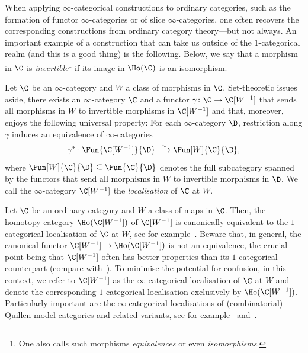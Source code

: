 \documentclass[a4paper]{amsart}
\begin{document}
When applying $\infty$-categorical constructions to ordinary categories, such as
the formation of functor $\infty$-categories or of slice $\infty$-categories,
one often recovers the corresponding constructions from ordinary category
theory---but not always. An important example of a construction that can take us
outside of the $1$-categorical realm (and this is a good thing) is the
following. Below, we say that a morphism in $\C$ is
\emph{invertible}\footnote{One also calls such morphisms \emph{equivalences} or
  even \emph{isomorphisms}.} if its image in $\Ho(\C)$ is an isomorphism.

\begin{defprop}
  \label{defprop:localisation}
  Let $\C$ be an $\infty$-category and $W$ a class of morphisms in $\C$.
  Set-theoretic issues aside, there exists an $\infty$-category $\C$ and a
  functor $\gamma\colon\C\to\C[W^{-1}]$ that sends all morphisms in $W$ to
  invertible morphisms in $\C[W^{-1}]$ and that, moreover, enjoys the following
  universal property: For each $\infty$-category $\D$, restriction along
  $\gamma$ induces an equivalence of $\infty$-categories
  \[
    \gamma^*\colon\Fun{\C[W^{-1}]}{\D}\stackrel{\sim}{\longrightarrow}\Fun[W]{\C}{\D},
  \]
  where $\Fun[W]{\C}{\D}\subseteq\Fun{\C}{\D}$ denotes the full subcategory
  spanned by the functors that send all morphisms in $W$ to invertible morphisms
  in $\D$. We call the $\infty$-category $\C[W^{-1}]$ the \emph{localisation} of
  $\C$ at $W$.
\end{defprop}

\begin{remark}
  \label{rmk:localisation}
  Let $\C$ be an ordinary category and $W$ a class of maps in $\C$. Then, the
  homotopy category $\Ho(\C[W^{-1}])$ of $\C[W^{-1}]$ is canonically equivalent
  to the $1$-categorical localisation of $\C$ at $W$, see for
  example~\cite[Remark~7.1.6]{Cis19}. Beware that, in general, the canonical
  functor $\C[W^{-1}]\to\Ho(\C[W^{-1}])$ is not an equivalence, the crucial
  point being that $\C[W^{-1}]$ often has better properties than its
  $1$-categorical counterpart (compare with~). To minimise
  the potential for confusion, in this context, we refer to $\C[W^{-1}]$ as the
  $\infty$-categorical localisation of $\C$ at $W$ and denote the corresponding
  $1$-categorical localisation exclusively by $\Ho(\C[W^{-1}])$. Particularly
  important are the $\infty$-categorical localisations of (combinatorial)
  Quillen model categories and related variants, see for
  example~\cite[Appendix~A.2]{Lur09} and~\cite[Chapter~7]{Cis19}.
\end{remark}
\end{document}

